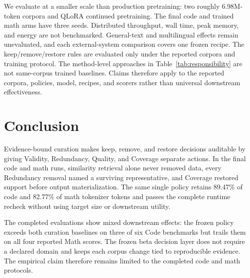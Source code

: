 \documentclass[conference]{IEEEtran}
\begin{document}
We evaluate at a smaller scale than production pretraining: two roughly 6.98M-token
corpora and QLoRA continued pretraining. The final code and trained math arms
have three seeds. Distributed throughput, wall time, peak memory, and
energy are not benchmarked. General-text and multilingual effects remain
unevaluated, and each external-system comparison covers one frozen recipe. The
keep/remove/restore rules are evaluated only under the reported corpora and training protocol.
The method-level approaches in
Table~\ref{tab:responsibility} are not same-corpus trained baselines. Claims therefore
apply to the reported corpora, policies, model, recipes, and scorers rather than
universal downstream effectiveness.

\section{Conclusion}
Evidence-bound curation makes keep, remove, and restore decisions auditable by
giving Validity, Redundancy, Quality, and Coverage separate actions. In the
final code and math runs, similarity retrieval alone never removed data, every
Redundancy removal named a surviving representative, and Coverage restored
support before output materialization. The same single policy retains 89.47\%
of code and 82.77\% of math tokenizer tokens and passes the complete runtime
recheck without using target size or downstream utility.

The completed evaluations show mixed downstream effects: the frozen policy
exceeds both curation baselines on three of six Code benchmarks but trails them
on all four reported Math scores. The frozen beta decision layer does not require a
declared domain and keeps each corpus change tied to reproducible evidence. The
empirical claim therefore remains limited to the completed code and math
protocols.
\end{document}
